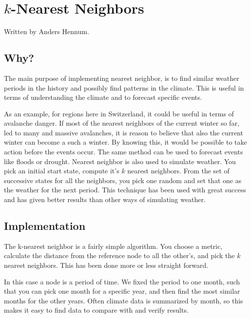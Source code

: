\section{$k$-Nearest Neighbors}
Written by Anders Hennum.

\subsection{Why?} %

The main purpose of implementing nearest neighbor, is to find similar weather
periods in the history and possibly find patterns in the climate. This is useful
in terms of understanding the climate and to forecast specific events. 

As an example, for regions here in Switzerland, it could be useful in terms of avalanche
danger. If most of the nearest neighbors of the current winter so far, led to
many and massive avalanches, it is reason to believe that also the current
winter can become a such a winter. By knowing this, it would be possible to take
action before the events occur. The same method can be used to forecast events
like floods or drought. Nearest neighbor is also used to simulate weather. You pick
an initial start state, compute it's $k$ nearest neighbors. From the set of 
successive states for all the neighbors, you pick one random and set that one as
the weather for the next period. This technique has been used with great success
and has given better results than other ways of simulating weather. 



\subsection{Implementation} %

The k-nearest neighbor is a fairly simple algorithm. You choose a metric,
calculate the distance from the reference node to all the other's, and pick the
$k$ nearest neighbors. This has been done more or less straight forward.

In this case a node is a period of time. We fixed the period to one month, such
that you can pick one month for a specific year, and then find the most similar
months for the other years. Often climate data is summarized by month, so this
makes it easy to find data to compare with and verify results.

